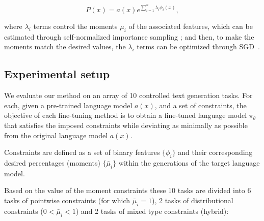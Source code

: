 \begin{equation} 
    P(x) = a(x)e^{\sum_{i=1}^n \lambda_i \phi_i(x)}, \label{eq:target-EBM}
\end{equation}

where $\lambda_i$ terms control the moments $\mu_i$ of the associated features, which can be estimated through self-normalized importance sampling \citep{owen_chapter_importance_sampling_2013}; and then, to make the moments match the desired values, the $\lambda_i$ terms can be optimized through SGD~\citep{A-parshakova-etal-2019-global}.

\subsection{Experimental setup}\label{subsec:exp_setup}

We evaluate our method on an array of 10 controlled text generation tasks. For each, given a pre-trained language model $a(x)$, and a set of constraints, the objective of each fine-tuning method is to obtain a fine-tuned language model ${\pi_\theta}$ that satisfies the imposed constraints while deviating as minimally as possible from the original language model $a(x)$. 

Constraints are defined as a set of binary features $\{\phi_i\}$ and their corresponding desired percentages (moments) $\{\bar{\mu}_i\}$ within the generations of the target language model.

Based on the value of the moment constraints these 10 tasks are divided into 6 tasks of pointwise constraints (for which  $\bar{\mu}_i = 1$), 2 tasks of distributional constraints ($0 < \bar{\mu}_i < 1$) and 2 tasks of mixed type constraints (hybrid):

